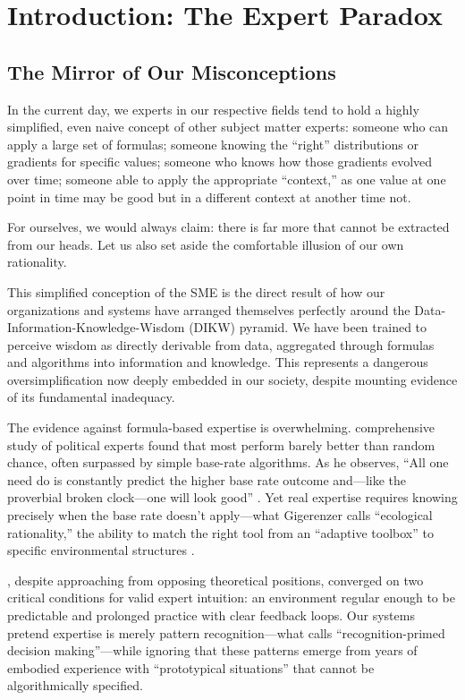 \section{Introduction: The Expert Paradox}

\subsection{The Mirror of Our Misconceptions}

In the current day, we experts in our respective fields tend to hold a highly simplified, even naive concept of other subject matter experts: someone who can apply a large set of formulas; someone knowing the ``right'' distributions or gradients for specific values; someone who knows how those gradients evolved over time; someone able to apply the appropriate ``context,'' as one value at one point in time may be good but in a different context at another time not.

For ourselves, we would always claim: there is far more that cannot be extracted from our heads. Let us also set aside the comfortable illusion of our own rationality.

This simplified conception of the SME is the direct result of how our organizations and systems have arranged themselves perfectly around the Data-Information-Knowledge-Wisdom (DIKW) pyramid. We have been trained to perceive wisdom as directly derivable from data, aggregated through formulas and algorithms into information and knowledge. This represents a dangerous oversimplification now deeply embedded in our society, despite mounting evidence of its fundamental inadequacy.

The evidence against formula-based expertise is overwhelming. \citet{tetlock2005} comprehensive study of political experts found that most perform barely better than random chance, often surpassed by simple base-rate algorithms. As he observes, ``All one need do is constantly predict the higher base rate outcome and---like the proverbial broken clock---one will look good'' \citep{tetlock2005}. Yet real expertise requires knowing precisely when the base rate doesn't apply---what Gigerenzer calls ``ecological rationality,'' the ability to match the right tool from an ``adaptive toolbox'' to specific environmental structures \citep{gigerenzer2001}.

\citet{kahneman2009}, despite approaching from opposing theoretical positions, converged on two critical conditions for valid expert intuition: an environment regular enough to be predictable and prolonged practice with clear feedback loops. Our systems pretend expertise is merely pattern recognition---what \citet{klein1993} calls ``recognition-primed decision making''---while ignoring that these patterns emerge from years of embodied experience with ``prototypical situations'' that cannot be algorithmically specified.

